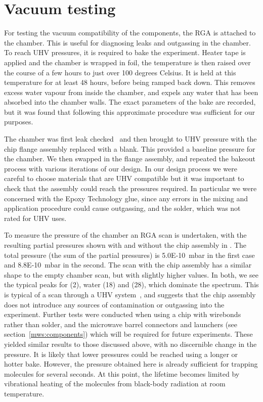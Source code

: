\section{Vacuum testing}
\label{exper:vacuum}

For testing the vacuum compatibility of the components, the RGA is attached to
the chamber. This is useful for diagnosing leaks and outgassing in the chamber.
To reach UHV pressures, it is required to bake the experiment.  Heater tape is
applied and the chamber is wrapped in foil, the temperature is then raised over
the course of a few hours to just over 100 degrees Celsius.  It is held at this
temperature for at least 48 hours, before being ramped back down. This removes
excess water vapour from inside the chamber, and expels any water that has been
absorbed into the chamber walls. The exact parameters of the bake are recorded,
but it was found that following this approximate procedure was sufficient for
our purposes.

The chamber was first leak checked~\cite{PfeifferVacuum} and then brought to
UHV pressure with the chip flange assembly replaced with a blank. This provided
a baseline pressure for the chamber. We then swapped in the flange assembly,
and repeated the bakeout process with various iterations of our design. In our
design process we were careful to choose materials that are UHV compatible but
it was important to check that the assembly could reach the pressures required.
In particular we were concerned with the Epoxy Technology glue, since any
errors in the mixing and application procedure could cause outgassing, and the
solder, which was not rated for UHV uses.

To measure the pressure of the chamber an RGA scan is undertaken, with the
resulting partial pressures shown with and without the chip assembly in
. The total pressure (the sum of the partial pressures)
is \SI{5.0E-10}{\milli\bar} in the first case and \SI{8.8E-10}{\milli\bar} in
the second.
%
The scan with the chip assembly has a similar shape to the empty chamber scan,
but with slightly higher values.  In both, we see the typical peaks for
\Htwo{} (2), water (18) and \Ntwo{} (28), which dominate the spectrum. This
is typical of a scan through a UHV system~\cite{PfeifferVacuum}, and suggests
that the chip assembly does not introduce any sources of contamination or
outgassing into the experiment.
%
Further tests were conducted when using a chip with wirebonds rather than
solder, and the microwave barrel connectors and launchers (see
section~\ref{mws:components}) which will be required for future experiments.
These yielded similar results to those discussed above, with no discernible
change in the pressure. It is likely that lower pressures could be reached
using a longer or hotter bake. However, the pressure obtained here is already
sufficient for trapping molecules for several seconds. At this point, the
lifetime becomes limited by vibrational heating of the molecules from
black-body radiation at room temperature.


